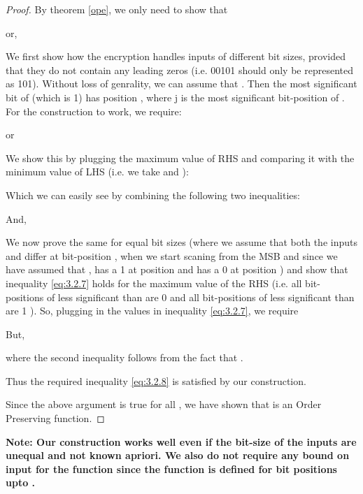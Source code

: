 \documentclass[11pt, letterpaper, romanappendices, onecolumn]{article}
\theoremstyle{plain}\newtheorem{thm}{Theorem}[section]
\theoremstyle{definition}
\theoremstyle{remark}
\begin{document}
\begin{proof}

\par By theorem \ref{ope}, we only need to show that

or,


\par We first show how the encryption handles inputs of different bit sizes, provided that they do not contain any leading zeros (i.e. 00101 should only be represented as 101). Without loss of genrality, we can assume that . Then the most significant bit of  (which is 1) has position , where j is the most significant bit-position of . For the construction to work, we require:
 
or

 

\par We show this by plugging the maximum value of RHS and comparing it with the minimum value of LHS (i.e. we take  and ):

 
 
 
Which we can easily see by combining the following two inequalities:

And,




\par We now prove the same for equal bit sizes (where we assume that both the inputs   and  differ at bit-position , when we start scaning from the MSB and since we have assumed that ,  has a 1 at position  and  has a 0 at position ) and show that inequality \eqref{eq:3.2.7} holds for the maximum value of the RHS (i.e. all bit-positions of  less significant than  are 0 and all bit-positions of  less significant than  are 1 ). So, plugging in the values in inequality \eqref{eq:3.2.7}, we require






\par But,


\par \quad where the second inequality follows from the fact that .

\par Thus the required inequality \eqref{eq:3.2.8} is satisfied by our construction.

\par Since the above argument is true for all , we have shown that  is an Order Preserving function.
\end{proof}

\par\textbf{ Note: Our construction works well even if the bit-size of the inputs are unequal and not known apriori. We also do not require any bound on input for the function since the function is defined for bit positions upto .}
\end{document}
